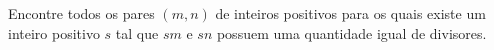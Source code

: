 Encontre todos os pares $(m, n)$ de inteiros positivos para os quais existe um inteiro positivo $s$ tal que $sm$ e $sn$ possuem uma quantidade igual de divisores.
